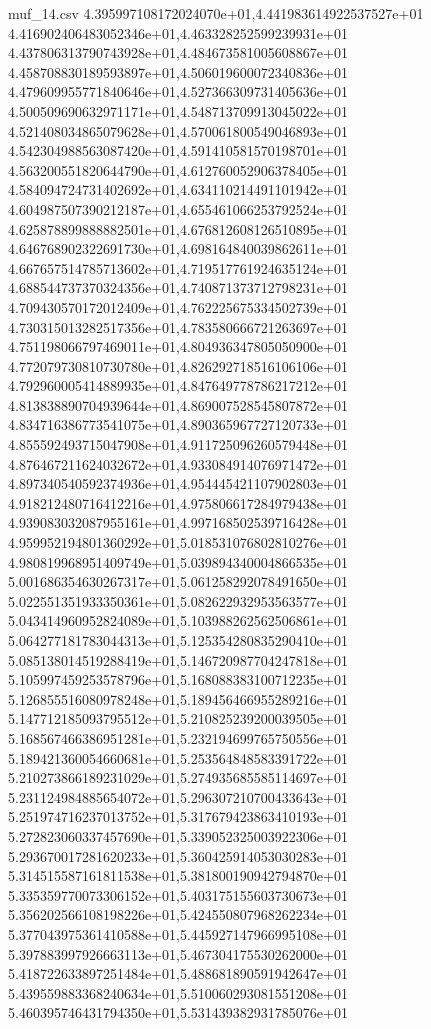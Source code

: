 \begin{filecontents*}{muf_14.csv}
4.395997108172024070e+01,4.441983614922537527e+01
4.416902406483052346e+01,4.463328252599239931e+01
4.437806313790743928e+01,4.484673581005608867e+01
4.458708830189593897e+01,4.506019600072340836e+01
4.479609955771840646e+01,4.527366309731405636e+01
4.500509690632971171e+01,4.548713709913045022e+01
4.521408034865079628e+01,4.570061800549046893e+01
4.542304988563087420e+01,4.591410581570198701e+01
4.563200551820644790e+01,4.612760052906378405e+01
4.584094724731402692e+01,4.634110214491101942e+01
4.604987507390212187e+01,4.655461066253792524e+01
4.625878899888882501e+01,4.676812608126510895e+01
4.646768902322691730e+01,4.698164840039862611e+01
4.667657514785713602e+01,4.719517761924635124e+01
4.688544737370324356e+01,4.740871373712798231e+01
4.709430570172012409e+01,4.762225675334502739e+01
4.730315013282517356e+01,4.783580666721263697e+01
4.751198066797469011e+01,4.804936347805050900e+01
4.772079730810730780e+01,4.826292718516106106e+01
4.792960005414889935e+01,4.847649778786217212e+01
4.813838890704939644e+01,4.869007528545807872e+01
4.834716386773541075e+01,4.890365967727120733e+01
4.855592493715047908e+01,4.911725096260579448e+01
4.876467211624032672e+01,4.933084914076971472e+01
4.897340540592374936e+01,4.954445421107902803e+01
4.918212480716412216e+01,4.975806617284979438e+01
4.939083032087955161e+01,4.997168502539716428e+01
4.959952194801360292e+01,5.018531076802810276e+01
4.980819968951409749e+01,5.039894340004866535e+01
5.001686354630267317e+01,5.061258292078491650e+01
5.022551351933350361e+01,5.082622932953563577e+01
5.043414960952824089e+01,5.103988262562506861e+01
5.064277181783044313e+01,5.125354280835290410e+01
5.085138014519288419e+01,5.146720987704247818e+01
5.105997459253578796e+01,5.168088383100712235e+01
5.126855516080978248e+01,5.189456466955289216e+01
5.147712185093795512e+01,5.210825239200039505e+01
5.168567466386951281e+01,5.232194699765750556e+01
5.189421360054660681e+01,5.253564848583391722e+01
5.210273866189231029e+01,5.274935685585114697e+01
5.231124984885654072e+01,5.296307210700433643e+01
5.251974716237013752e+01,5.317679423863410193e+01
5.272823060337457690e+01,5.339052325003922306e+01
5.293670017281620233e+01,5.360425914053030283e+01
5.314515587161811538e+01,5.381800190942794870e+01
5.335359770073306152e+01,5.403175155603730673e+01
5.356202566108198226e+01,5.424550807968262234e+01
5.377043975361410588e+01,5.445927147966995108e+01
5.397883997926663113e+01,5.467304175530262000e+01
5.418722633897251484e+01,5.488681890591942647e+01
5.439559883368240634e+01,5.510060293081551208e+01
5.460395746431794350e+01,5.531439382931785076e+01

\end{filecontents*}
